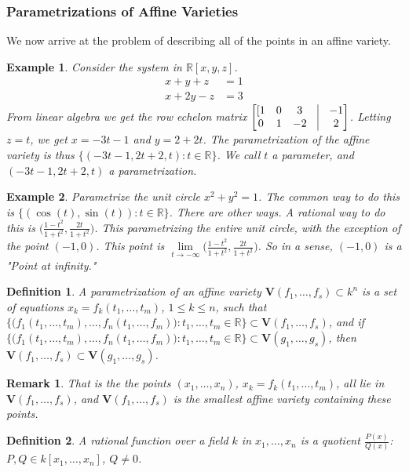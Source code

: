 \documentclass{article}
\theoremstyle{mystyle}
\newtheorem{definition}{Definition}[section]
\newtheorem{example}{Example}[section]
\newtheorem{remark}{Remark}[section]
\begin{document}
\subsubsection{Parametrizations of Affine Varieties}
We now arrive at the problem of describing all of the points in an affine variety. 
\begin{example}
Consider the system in $\mathbb{R}[x,y,z]$.
\begin{align*}
    x+y+z &= 1 \\
    x+2y-z &= 3
\end{align*}
From linear algebra we get the row echelon matrix $\begin{bmatrix}[1 & 0 & 3 & \vline & -1 \\ 0 & 1 & -2 & \vline & 2 \end{bmatrix}$. Letting $z=t$, we get $x = -3t-1$ and $y = 2+2t$. The parametrization of the affine variety is thus $\{(-3t-1,2t+2,t):t\in \mathbb{R}\}$. We call $t$ a parameter, and $(-3t-1,2t+2,t)$ a parametrization.
\end{example}
\begin{example}
Parametrize the unit circle $x^2+y^2=1$. The common way to do this is $\{(\cos(t),\sin(t)):t\in \mathbb{R}\}$. There are other ways. A rational way to do this is $\big(\frac{1-t^2}{1+t^2}, \frac{2t}{1+t^2}\big)$. This parametrizing the entire unit circle, with the exception of the point $(-1,0)$. This point is $\underset{t\rightarrow -\infty} \lim \big(\frac{1-t^2}{1+t^2},\frac{2t}{1+t^2}\big)$. So in a sense, $(-1,0)$ is a "Point at infinity."
\end{example}
\begin{definition}
A parametrization of an affine variety $\mathbf{V}(f_1,\hdots, f_s) \subset k^n$ is a set of equations $x_k = f_k(t_1,\hdots, t_m)$, $1\leq k \leq n$, such that $ \{\big(f_1(t_1,\hdots, t_m),\hdots, f_n(t_1,\hdots, f_m)\big): t_1,\hdots, t_m \in \mathbb{R}\}\subset \mathbf{V}(f_1,\hdots, f_s)$, and if $\{\big(f_1(t_1,\hdots, t_m),\hdots, f_n(t_1,\hdots, f_m)\big): t_1,\hdots, t_m \in \mathbb{R}\}\subset \mathbf{V}(g_1,\hdots, g_s)$, then $\mathbf{V}(f_1,\hdots, f_s) \subset \mathbf{V}(g_1,\hdots, g_s)$.
\end{definition}
\begin{remark}
That is the the points $(x_1,\hdots, x_n)$, $x_k = f_k(t_1,\hdots, t_m)$, all lie in $\mathbf{V}(f_1,\hdots, f_s)$, and $\mathbf{V}(f_1,\hdots, f_s)$ is the smallest affine variety containing these points.
\end{remark}
\begin{definition}
A rational function over a field $k$ in $x_1,\hdots, x_n$ is a quotient $\frac{P(x)}{Q(x)}$: $P,Q \in k[x_1,\hdots ,x_n]$, $Q\ne 0$.
\end{definition}
\end{document}
